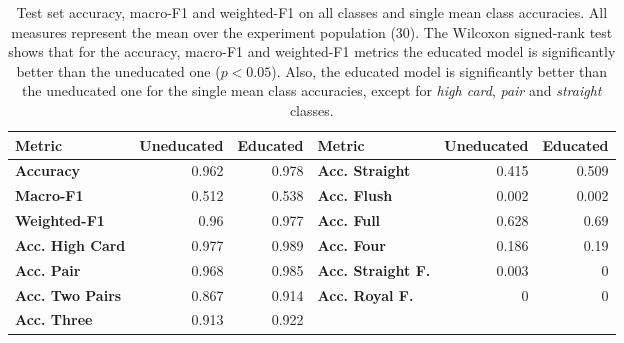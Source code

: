 
\begin{table}
    \centering
     \begin{adjustbox}{width=\linewidth,center}
         \begin{tabular}{l|rr||l|rr}
             \textbf{Metric} & \textbf{Uneducated} & \textbf{Educated} & \textbf{Metric} & \textbf{Uneducated} & \textbf{Educated}
             \\
             \hline\hline
             \textbf{Accuracy} & 0.962 & 0.978 & \textbf{Acc. Straight} & 0.415 & 0.509
             \\
             \textbf{Macro-F1} & 0.512 & 0.538 & \textbf{Acc. Flush} & 0.002 & 0.002
             \\
             \textbf{Weighted-F1} & 0.96 & 0.977 & \textbf{Acc. Full} & 0.628 & 0.69
             \\
             \textbf{Acc. High Card} & 0.977 & 0.989 & \textbf{Acc. Four} & 0.186 & 0.19
             \\
             \textbf{Acc. Pair} & 0.968 & 0.985 & \textbf{Acc. Straight F.} & 0.003 & 0
             \\
             \textbf{Acc. Two Pairs} & 0.867 & 0.914 & \textbf{Acc. Royal F.} & 0 & 0
             \\
             \textbf{Acc. Three} & 0.913 & 0.922 & & &
        \end{tabular}
     \end{adjustbox}
    \caption{
        Test set accuracy, macro-F1 and weighted-F1 on all classes and single mean class accuracies.
        All measures represent the mean over the experiment population (30).
        The Wilcoxon signed-rank test shows that for the accuracy, macro-F1 and weighted-F1 metrics the educated model is significantly better than the uneducated one ($p < 0.05$).
        Also, the educated model is significantly better than the uneducated one for the single mean class accuracies, except for \emph{high card}, \emph{pair} and \emph{straight} classes.
    }
    \label{tab:phds-kill-results}
\end{table}
